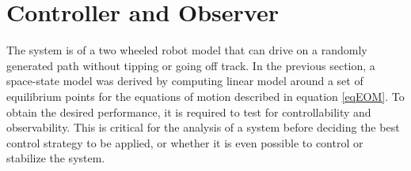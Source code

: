 \documentclass[12pt]{article}
\begin{document}

\section{Controller and Observer}
The system is of a two wheeled robot model that can drive on a randomly generated path without tipping or going off track. In the previous section, a space-state model was derived by computing linear model around a set of equilibrium points for the equations of motion described in equation \eqref{eqEOM}. To obtain the desired performance, it is required to test for controllability and observability.  This is critical for the analysis of a system before deciding the best control strategy to be applied, or whether it is even possible to control or stabilize the system. 
\end{document}
